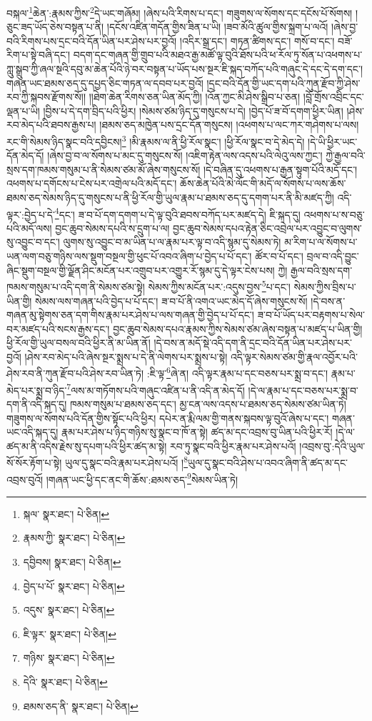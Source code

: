 བསྐལ་\footnote{སྐལ་  སྣར་ཐང་།  པེ་ཅིན། }ཆེན་:རྣམས་ཀྱིས་\footnote{རྣམས་ཀྱི་  སྣར་ཐང་།  པེ་ཅིན། }དེ་ཡང་གཞོམ། །ཞེས་པའི་རིགས་པ་དང་། གཟུགས་ལ་སོགས་དང་དངོས་པོ་སོགས། །ཅུང་ཟད་ཡོད་ཅེས་བསྟན་པ་ནི། །དངོས་འཛིན་གདོན་གྱིས་ཟིན་པ་ཡི། །ཟབ་མོའི་ཚུལ་གྱིས་སྐྲག་པ་ལའོ། །ཞེས་བྱ་བའི་རིགས་པས་དྲང་བའི་དོན་ཡིན་པར་ཤེས་པར་བྱའོ། །འདིར་སྒྲ་དང་། གཏན་ཚིགས་དང་། གསོ་བ་དང་། བཟོ་རིག་པ་སྟེ་བཞི་དང་། བདག་དང་གཞན་གྱི་གྲུབ་པའི་མཐའ་རྒྱ་མཚོ་ལྟ་བུའི་ཐོས་པའི་ཕ་རོལ་ཏུ་སོན་པ་འཕགས་པ་ཀླུ་སྒྲུབ་ཀྱི་ཞལ་སྔའི་དབུ་མ་ཆེན་པོའི་ཉེ་བར་བསྟན་པ་ཡོད་པས་སྔར་ཇི་སྐད་བཀོད་པའི་གཞུང་དེ་དང་དེ་དག་དང་། གཞན་ཡང་ཐམས་ཅད་དུ་དཔྱད་ཅིང་གཏན་ལ་དབབ་པར་བྱའོ། །དྲང་བའི་དོན་གྱི་ཡང་དག་པའི་ཀུན་རྫོབ་ཀྱི་ཤེས་རབ་ཀྱི་སྐབས་རྫོགས་སོ།། །།ཐེག་ཆེན་རིགས་ཅན་ཡིན་མོད་ཀྱི། །འོན་ཀྱང་མི་ཤེས་སྒྲིབ་པ་ཅན། །བློ་གྲོས་འབྲིང་དང་ལྡན་པ་ཡི། །བྱིས་པ་དེ་དག་བྲིད་པའི་ཕྱིར། །སེམས་ཙམ་ཉིད་དུ་གསུངས་པ་དེ། །བྱེད་པོ་ཟ་བོ་དགག་ཕྱིར་ཡིན། །ཤེས་རབ་མེད་པའི་ཐབས་རྒྱས་པ། །ཐམས་ཅད་མཁྱེན་པས་དྲང་དོན་གསུངས། །འཕགས་པ་ལང་ཀར་གཤེགས་པ་ལས། རང་གི་སེམས་ཉིད་སྣང་བའི་དབྱིངས།\footnote{དབྱིབས།  སྣར་ཐང་།  པེ་ཅིན། } །མི་རྣམས་ལ་ནི་ཕྱི་རོལ་སྣང་། །ཕྱི་རོལ་སྣང་བ་དེ་མེད་དེ། །དེ་ཡི་ཕྱིར་ཡང་དོན་མེད་དོ། །ཞེས་བྱ་བ་ལ་སོགས་པ་མང་དུ་གསུངས་སོ། །འཇིག་རྟེན་ལས་འདས་པའི་ལེའུ་ལས་ཀྱང་། ཀྱེ་རྒྱལ་བའི་སྲས་དག་ཁམས་གསུམ་པ་ནི་སེམས་ཙམ་མོ་ཞེས་གསུངས་སོ། །དེ་བཞིན་དུ་འཕགས་པ་རྒྱན་སྟུག་པོའི་མདོ་དང་། འཕགས་པ་དགོངས་པ་ངེས་པར་འགྲེལ་པའི་མདོ་དང་། ཆོས་ཆེན་པོའི་མེ་ལོང་གི་མདོ་ལ་སོགས་པ་ལས་ཆོས་ཐམས་ཅད་སེམས་ཉིད་དུ་གསུངས་པ་ནི་ཕྱི་རོལ་གྱི་ཡུལ་རྣམ་པ་ཐམས་ཅད་དུ་དགག་པར་ནི་མི་མཛད་ཀྱི། འདི་ལྟར་:བྱེད་པ་དེ་\footnote{བྱེད་པ་པོ་  སྣར་ཐང་།  པེ་ཅིན། }དང་། ཟ་བ་པོ་དག་དགག་པ་དེ་ལྟ་བུའི་ཐབས་བཀོད་པར་མཛད་དེ། ཇི་སྐད་དུ། འཕགས་པ་ས་བཅུ་པའི་མདོ་ལས། བྱང་ཆུབ་སེམས་དཔའི་ས་དྲུག་པ་ལ། བྱང་ཆུབ་སེམས་དཔའ་རྟེན་ཅིང་འབྲེལ་པར་འབྱུང་བ་ལུགས་སུ་འབྱུང་བ་དང་། ལུགས་སུ་འབྱུང་བ་མ་ཡིན་པ་ལ་རྣམ་པར་ལྟ་བ་འདི་སྙམ་དུ་སེམས་ཏེ། མ་རིག་པ་ལ་སོགས་པ་ཡན་ལག་བཅུ་གཉིས་ལས་སྡུག་བསྔལ་གྱི་ཕུང་པོ་འབའ་ཞིག་པ་བྱེད་པ་པོ་དང་། ཚོར་བ་པོ་དང་། བྲལ་བ་འདི་བྱུང་ཞིང་སྡུག་བསྔལ་གྱི་ལྗོན་ཤིང་མངོན་པར་འགྲུབ་པར་འགྱུར་རོ་སྙམ་དུ་དེ་ལྟར་ངེས་པས། ཀྱེ། རྒྱལ་བའི་སྲས་དག་ཁམས་གསུམ་པ་འདི་དག་ནི་སེམས་ཙམ་སྟེ། སེམས་ཀྱིས་མངོན་པར་:འདུས་བྱས་\footnote{འདུས་  སྣར་ཐང་།  པེ་ཅིན། }པ་དང་། སེམས་ཀྱིས་བྲིས་པ་ཡིན་གྱི། སེམས་ལས་གཞན་པའི་བྱེད་པ་པོ་དང་། ཟ་བ་པོ་ནི་འགའ་ཡང་མེད་དོ་ཞེས་གསུངས་སོ། །དེ་བས་ན་གཞན་མུ་སྟེགས་ཅན་དག་གིས་རྣམ་པར་ཤེས་པ་ལས་གཞན་གྱི་བྱེད་པ་པོ་དང་། ཟ་བ་པོ་ཡོད་པར་བརྟགས་པ་སེལ་བར་མཛད་པའི་སངས་རྒྱས་དང་། བྱང་ཆུབ་སེམས་དཔའ་རྣམས་ཀྱིས་སེམས་ཙམ་ཞེས་བསྟན་པ་མཛད་པ་ཡིན་གྱི། ཕྱི་རོལ་གྱི་ཡུལ་བསལ་བའི་ཕྱིར་ནི་མ་ཡིན་ནོ། །དེ་བས་ན་མདོ་སྡེ་འདི་དག་ནི་དྲང་བའི་དོན་ཡིན་པར་ཤེས་པར་བྱའོ། །ཤེས་རབ་མེད་པའི་ཞེས་སྔར་སྨྲས་པ་དེ་ནི་ལེགས་པར་སྨྲས་པ་སྟེ། འདི་ལྟར་སེམས་ཙམ་གྱི་རྣལ་འབྱོར་པའི་ཤེས་རབ་ནི་ཀུན་རྫོབ་པའི་ཤེས་རབ་ཡིན་ཏེ། :ཇི་ལྟ་\footnote{ཇི་ལྟར་  སྣར་ཐང་།  པེ་ཅིན། }ཞེ་ན། འདི་ལྟར་རྣམ་པ་དང་བཅས་པར་སྨྲ་བ་དང་། རྣམ་པ་མེད་པར་སྨྲ་བ་ཉིད་\footnote{གཉིས་  སྣར་ཐང་།  པེ་ཅིན། }ལས་མ་གཏོགས་པའི་གཞུང་འཛིན་པ་ནི་འདི་ན་མེད་དོ། །དེ་ལ་རྣམ་པ་དང་བཅས་པར་སྨྲ་བ་དག་ནི་འདི་སྐད་དུ། ཁམས་གསུམ་པ་ཐམས་ཅད་དང་། མྱ་ངན་ལས་འདས་པ་ཐམས་ཅད་སེམས་ཙམ་ཡིན་ཏེ། གཟུགས་ལ་སོགས་པའི་དོན་གྱིས་སྟོང་པའི་ཕྱིར། དཔེར་ན་རྨི་ལམ་གྱི་གནས་སྐབས་ལྟ་བུའོ་ཞེས་པ་དང་། གཞན་ཡང་འདི་སྐད་དུ། རྣམ་པར་ཤེས་པ་ཉིད་གཉིས་སུ་སྣང་བ་ཁོ་ན་སྟེ། ཚད་མ་དང་འབྲས་བུ་ཡིན་པའི་ཕྱིར་རོ། །དེ་ལ་ཚད་མ་ནི་འདིས་རྗེས་སུ་དཔག་པའི་ཕྱིར་ཚད་མ་སྟེ། རབ་ཏུ་སྣང་བའི་ཕྱིར་རྣམ་པར་ཤེས་པའོ། །འབྲས་བུ་:དེའི་ཡུལ་སོ་སོར་རྟོག་པ་སྟེ། ཡུལ་དུ་སྣང་བའི་རྣམ་པར་ཤེས་པའོ། །\footnote{དེའི་  སྣར་ཐང་།  པེ་ཅིན། }ཡུལ་དུ་སྣང་བའི་ཤེས་པ་འབའ་ཞིག་ནི་ཚད་མ་དང་འབྲས་བུའོ། །གཞན་ཡང་ཕྱི་དང་ནང་གི་ཆོས་:ཐམས་ཅད་\footnote{ཐམས་ཅད་ནི་  སྣར་ཐང་།  པེ་ཅིན། }སེམས་ཡིན་ཏེ། 